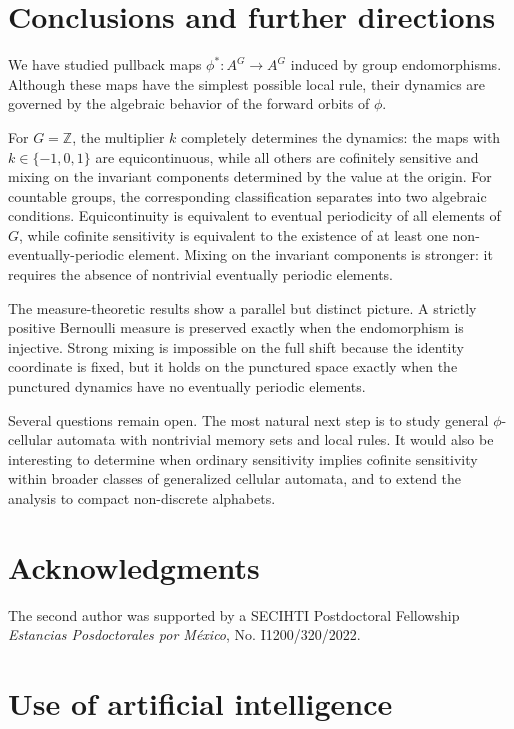 \documentclass[12pt,a4paper]{article}
\theoremstyle{definition}
\theoremstyle{remark}
\newcommand{\ZZ}{\mathbb{Z}}
\begin{document}
\section{Conclusions and further directions}\label{sec:conclusions}

We have studied pullback maps $\phi^*:A^G\to A^G$ induced by group endomorphisms. Although these maps have the simplest possible local rule, their dynamics are governed by the algebraic behavior of the forward orbits of $\phi$.

For $G=\ZZ$, the multiplier $k$ completely determines the dynamics: the maps with $k\in\{-1,0,1\}$ are equicontinuous, while all others are cofinitely sensitive and mixing on the invariant components determined by the value at the origin. For countable groups, the corresponding classification separates into two algebraic conditions. Equicontinuity is equivalent to eventual periodicity of all elements of $G$, while cofinite sensitivity is equivalent to the existence of at least one non-eventually-periodic element. Mixing on the invariant components is stronger: it requires the absence of nontrivial eventually periodic elements.

The measure-theoretic results show a parallel but distinct picture. A strictly positive Bernoulli measure is preserved exactly when the endomorphism is injective. Strong mixing is impossible on the full shift because the identity coordinate is fixed, but it holds on the punctured space exactly when the punctured dynamics have no eventually periodic elements.

Several questions remain open. The most natural next step is to study general $\phi$-cellular automata with nontrivial memory sets and local rules. It would also be interesting to determine when ordinary sensitivity implies cofinite sensitivity within broader classes of generalized cellular automata, and to extend the analysis to compact non-discrete alphabets.

\section*{Acknowledgments}

The second author was supported by a SECIHTI Postdoctoral Fellowship \emph{Estancias Posdoctorales por M\'exico}, No. I1200/320/2022.  

\section*{Use of artificial intelligence}
\end{document}
